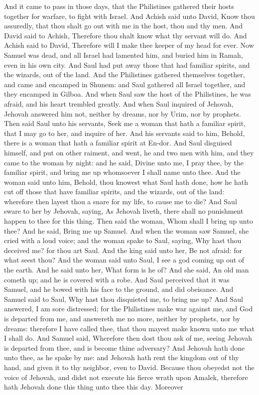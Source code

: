 And it came to pass in those days, that the Philistines gathered their hosts together for warfare, to fight with Israel. And Achish said unto David, Know thou assuredly, that thou shalt go out with me in the host, thou and thy men. And David said to Achish, Therefore thou shalt know what thy servant will do. And Achish said to David, Therefore will I make thee keeper of my head for ever.  Now Samuel was dead, and all Israel had lamented him, and buried him in Ramah, even in his own city. And Saul had put away those that had familiar spirits, and the wizards, out of the land. And the Philistines gathered themselves together, and came and encamped in Shunem: and Saul gathered all Israel together, and they encamped in Gilboa. And when Saul saw the host of the Philistines, he was afraid, and his heart trembled greatly. And when Saul inquired of Jehovah, Jehovah answered him not, neither by dreams, nor by Urim, nor by prophets. Then said Saul unto his servants, Seek me a woman that hath a familiar spirit, that I may go to her, and inquire of her. And his servants said to him, Behold, there is a woman that hath a familiar spirit at En-dor.  And Saul disguised himself, and put on other raiment, and went, he and two men with him, and they came to the woman by night: and he said, Divine unto me, I pray thee, by the familiar spirit, and bring me up whomsoever I shall name unto thee. And the woman said unto him, Behold, thou knowest what Saul hath done, how he hath cut off those that have familiar spirits, and the wizards, out of the land: wherefore then layest thou a snare for my life, to cause me to die? And Saul sware to her by Jehovah, saying, As Jehovah liveth, there shall no punishment happen to thee for this thing. Then said the woman, Whom shall I bring up unto thee? And he said, Bring me up Samuel. And when the woman saw Samuel, she cried with a loud voice; and the woman spake to Saul, saying, Why hast thou deceived me? for thou art Saul. And the king said unto her, Be not afraid: for what seest thou? And the woman said unto Saul, I see a god coming up out of the earth. And he said unto her, What form is he of? And she said, An old man cometh up; and he is covered with a robe. And Saul perceived that it was Samuel, and he bowed with his face to the ground, and did obeisance.  And Samuel said to Saul, Why hast thou disquieted me, to bring me up? And Saul answered, I am sore distressed; for the Philistines make war against me, and God is departed from me, and answereth me no more, neither by prophets, nor by dreams: therefore I have called thee, that thou mayest make known unto me what I shall do. And Samuel said, Wherefore then dost thou ask of me, seeing Jehovah is departed from thee, and is become thine adversary? And Jehovah hath done unto thee, as he spake by me: and Jehovah hath rent the kingdom out of thy hand, and given it to thy neighbor, even to David. Because thou obeyedst not the voice of Jehovah, and didst not execute his fierce wrath upon Amalek, therefore hath Jehovah done this thing unto thee this day. Moreover 